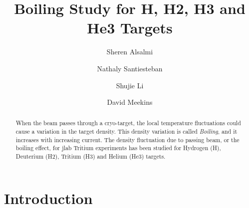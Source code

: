 \documentclass[preprint,12pt]{elsarticle}
\begin{document}
\begin{frontmatter}



\title{Boiling Study for H, H2, H3 and He3 Targets}

\author[Kent]{Sheren Alsalmi}
\author[UNH]{Nathaly Santiesteban}
\author[UNH]{Shujie Li}
\author[JLab]{David Meekins}

\address[Kent]{Kent State University}
\address[UNH]{University of New Hampshire}
\address[JLab]{Jefferson Lab}

\begin{abstract}
When the beam passes through a cryo-target, the local temperature fluctuations could 
cause a variation in the target density. This density variation is called \emph{Boiling}, 
and it increases with increasing current. The density fluctuation due to passing beam, 
or the boiling effect, for jlab Tritium experiments has been studied for Hydrogen (H), 
Deuterium (H2), Tritium (H3) and Helium (He3) targets.\par
\end{abstract}

\begin{keyword}

\end{keyword}
\end{frontmatter}


\section{Introduction}
\label{}
\end{document}
